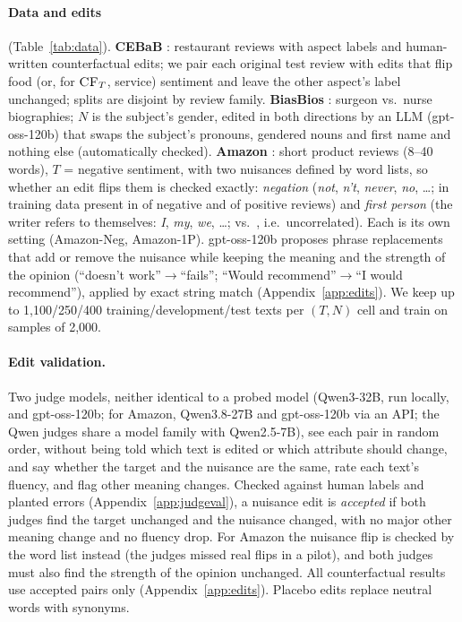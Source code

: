 \documentclass[11pt]{article}
\newcommand{\cft}{\textsc{CF}_{T}}
\begin{document}
\paragraph{Data and edits} (Table~\ref{tab:data}). \textbf{CEBaB} \citep{abraham2022cebab}: restaurant reviews with aspect labels and human-written counterfactual edits; we pair each original test review with edits that flip food (or, for $\cft$, service) sentiment and leave the other aspect's label unchanged; splits are disjoint by review family. \textbf{BiasBios} \citep{dearteaga2019bias}: surgeon vs.\ nurse biographies; $N$ is the subject's gender, edited in both directions by an LLM (gpt-oss-120b) that swaps the subject's pronouns, gendered nouns and first name and nothing else (automatically checked). \textbf{Amazon} \citep{mcauley2013hidden,zhang2015character}: short product reviews (8--40 words), $T$ = negative sentiment, with two nuisances defined by word lists, so whether an edit flips them is checked exactly: \emph{negation} (\emph{not}, \emph{n't}, \emph{never}, \emph{no}, \dots; in training data present in \amzNegNeg{} of negative and \amzNegPos{} of positive reviews) and \emph{first person} (the writer refers to themselves: \emph{I}, \emph{my}, \emph{we}, \dots; \amzFpNeg{} vs.\ \amzFpPos{}, i.e.\ uncorrelated). Each is its own setting (Amazon-Neg, Amazon-1P). gpt-oss-120b proposes phrase replacements that add or remove the nuisance while keeping the meaning and the strength of the opinion (``doesn't work''$\to$``fails''; ``Would recommend''$\to$``I would recommend''), applied by exact string match (Appendix~\ref{app:edits}). We keep up to 1{,}100/250/400 training/development/test texts per $(T,N)$ cell and train on samples of 2{,}000.

\paragraph{Edit validation.} Two judge models, neither identical to a probed model (Qwen3-32B, run locally, and gpt-oss-120b; for Amazon, Qwen3.8-27B and gpt-oss-120b via an API; the Qwen judges share a model family with Qwen2.5-7B), see each pair in random order, without being told which text is edited or which attribute should change, and say whether the target and the nuisance are the same, rate each text's fluency, and flag other meaning changes. Checked against human labels and planted errors (Appendix~\ref{app:judgeval}), a nuisance edit is \emph{accepted} if both judges find the target unchanged and the nuisance changed, with no major other meaning change and no fluency drop. For Amazon the nuisance flip is checked by the word list instead (the judges missed real flips in a pilot), and both judges must also find the strength of the opinion unchanged. All counterfactual results use accepted pairs only (Appendix~\ref{app:edits}). Placebo edits replace neutral words with synonyms.
\end{document}
